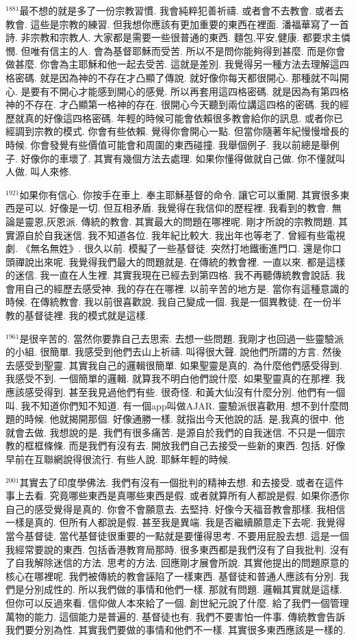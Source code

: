 \documentclass{book}
\begin{document}
$^{1881}$最不想的就是多了一份宗教習慣.
我會純粹犯善祈禱.
或者會不去教會.
或者去教會.
這些是宗教的練習.
但我想你應該有更加重要的東西在裡面.
潘福華寫了一首詩.
非宗教和宗教人.
大家都是需要一些很普通的東西.
麵包,平安,健康.
都要求主憐憫.
但唯有信主的人.
會為基督耶穌而受苦.
所以不是問你能夠得到甚麼.
而是你會做甚麼.
你會為主耶穌和他一起去受苦.
這就是差別.
我覺得另一種方法去理解這四格密碼.
就是因為神的不存在才凸顯了傳說.
就好像你每天都很開心.
那種就不叫開心.
是要有不開心才能感到開心的感覺.
所以再套用這四格密碼.
就是因為有第四格神的不存在.
才凸顯第一格神的存在.
很開心今天聽到兩位講這四格的密碼.
我的經歷就真的好像這四格密碼.
年輕的時候可能會依賴很多教會給你的訊息.
或者你已經調到宗教的模式.
你會有些依賴.
覺得你會開心一點.
但當你隨著年紀慢慢增長的時候.
你會發覺有些價值可能會和周圍的東西碰撞.
我舉個例子.
我以前總是舉例子.
好像你的車壞了.
其實有幾個方法去處理.
如果你懂得做就自己做.
你不懂就叫人做.
叫人來修.

$^{1921}$如果你有信心.
你按手在車上.
奉主耶穌基督的命令.
讓它可以重開.
其實很多東西是可以.
好像是一切.
但互相矛盾.
我覺得在我信仰的歷程裡.
我看到的教會.
無論是靈恩,灰恩派.
傳統的教會.
其實最大的問題在哪裡呢.
剛才所說的宗教問題.
其實源自於自我迷信.
我不知道各位.
我年紀比較大.
我出年也等老了.
曾經有些電視劇.
《無名無姓》.
很久以前.
模擬了一些基督徒.
突然打地鐵衝進門口.
還是你口頭禪說出來呢.
我覺得我們最大的問題就是.
在傳統的教會裡.
一直以來.
都是這樣的迷信.
我一直在人生裡.
其實我現在已經去到第四格.
我不再聽傳統教會說話.
我會用自己的經歷去感受神.
我的存在在哪裡.
以前辛苦的地方是.
當你有這種意識的時候.
在傳統教會.
我以前很喜歡說.
我自己變成一個.
我是一個異教徒.
在一份半教的基督徒裡.
我的模式就是這樣.

$^{1961}$是很辛苦的.
當然你要靠自己去思索.
去想一些問題.
我剛才也回過一些靈驗派的小組.
很簡單.
我感受到他們去山上祈禱.
叫得很大聲.
說他們所謂的方言.
然後去感受到聖靈.
其實我自己的邏輯很簡單.
如果聖靈是真的.
為什麼他們感受得到.
我感受不到.
一個簡單的邏輯.
就算我不明白他們說什麼.
如果聖靈真的在那裡.
我應該感受得到.
甚至我見過他們有些.
很奇怪.
和黃大仙沒有什麼分別.
他們有一個叫.
我不知道你們知不知道.
有一個app叫做AJAR.
靈驗派很喜歡用.
想不到什麼問題的時候.
他就揭開那個.
好像通勝一樣.
就指出今天他說的話.
是,我真的很中.
他就會去做.
我想說的是.
我們有很多痛苦.
是源自於我們的自我迷信.
不只是一個宗教的框框條條.
而是我們有沒有去.
開放我們自己去接受一些新的東西.
包括.
好像早前在互聯網說得很流行.
有些人說.
耶穌年輕的時候.

$^{2001}$其實去了印度學佛法.
我們有沒有一個批判的精神去想.
和去接受.
或者在這件事上去看.
究竟哪些東西是真哪些東西是假.
或者就算所有人都說是假.
如果你憑你自己的感受覺得是真的.
你會不會願意去.
去堅持.
好像今天福音教會那樣.
我相信一樣是真的.
但所有人都說是假.
甚至我是異端.
我是否繼續願意走下去呢.
我覺得當今基督徒.
當代基督徒很重要的一點就是要懂得思考.
不要用屁股去想.
這是一個我經常要說的東西.
包括香港教育局那時.
很多東西都是我們沒有了自我批判.
沒有了自我解除迷信的方法.
思考的方法.
回應剛才展會所說.
其實他提出的問題原意的核心在哪裡呢.
我們被傳統的教會誣陷了一樣東西.
基督徒和普通人應該有分別.
我們是分別成性的.
所以我們做的事情和他們一樣.
那就有問題.
邏輯其實就是這樣.
但你可以反過來看.
信仰做人本來給了一個.
創世紀元說了什麼.
給了我們一個管理萬物的能力.
這個能力是普遍的.
基督徒也有.
我們不要害怕一件事.
傳統教會告訴我們要分別為性.
其實我們要做的事情和他們不一樣.
其實很多東西應該是一樣的.
\end{document}
